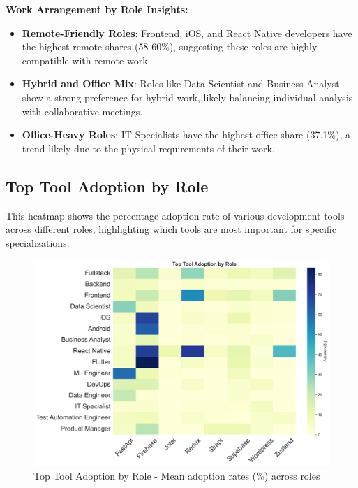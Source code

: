 \documentclass[12pt,a4paper]{article}
\begin{document}
\textbf{Work Arrangement by Role Insights:}
\begin{itemize}
	\item \textbf{Remote-Friendly Roles}: Frontend, iOS, and React Native developers have the highest remote shares (58-60\%), suggesting these roles are highly compatible with remote work.
	\item \textbf{Hybrid and Office Mix}: Roles like Data Scientist and Business Analyst show a strong preference for hybrid work, likely balancing individual analysis with collaborative meetings.
	\item \textbf{Office-Heavy Roles}: IT Specialists have the highest office share (37.1\%), a trend likely due to the physical requirements of their work.
\end{itemize}

\subsection{Top Tool Adoption by Role}
This heatmap shows the percentage adoption rate of various development tools across different roles, highlighting which tools are most important for specific specializations.

\begin{figure}[H]
	\centering
	\includegraphics[width=\textwidth]{figures/heatmap_tool_adoption_by_role.png}
	\caption{Top Tool Adoption by Role - Mean adoption rates (\%) across roles}
\end{figure}
\end{document}
